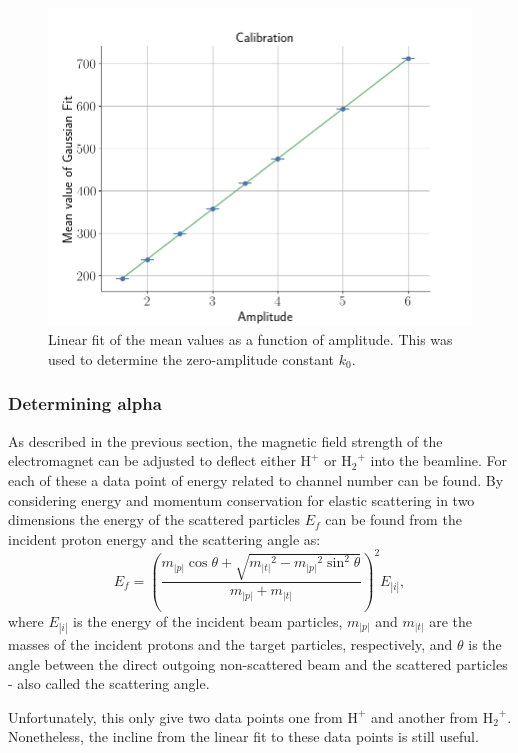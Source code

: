 \begin{figure}[h]
\centering
\includegraphics[width=0.99\columnwidth]{k0_plotting}
\caption{Linear fit of the mean values as a function of amplitude. This was
used to determine the zero-amplitude constant $k_0$.}
\label{fig_linear_fit}
\end{figure}

\subsubsection{Determining alpha}
As described in the previous section, the magnetic field strength of the
electromagnet can be adjusted to deflect either $\mathrm{H^+}$ or
$\mathrm{{H_2}^+}$ into the beamline. For each of these a data point of energy
related to channel number can be found.
By considering energy and momentum conservation for elastic scattering in two
dimensions the energy of the scattered particles $E_f$ can be found from the
incident proton energy and the scattering angle as:
\begin{equation}
E_f = \left( \frac{m_|p| \cos\theta + \sqrt{{m_|t|}^2 - {m_|p|}^2
\sin^2\theta}}{m_|p|+m_|t|} \right)^2 E_|i|,
\end{equation}
where $E_|i|$ is the energy of the incident beam particles, $m_|p|$ and $m_|t|$ are
the masses of the incident protons and the target particles, respectively, and
$\theta$ is the angle between the direct outgoing non-scattered beam and the
scattered particles - also called the scattering angle.

Unfortunately, this only give two data points one from $\mathrm{H^+}$ and
another from $\mathrm{{H_2}^+}$. Nonetheless, the incline from the linear fit
to these data points is still useful.

